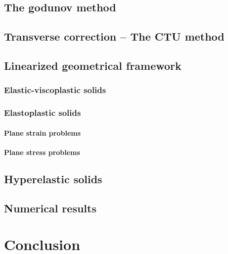 \documentclass[10pt,a4paper]{report}
\begin{document}
		\section{The godunov method}
		\section{Transverse correction -- The CTU method}
		\section{Linearized geometrical framework}
			\subsection{Elastic-viscoplastic solids}
			\subsection{Elastoplastic solids}
				\subsubsection{Plane strain problems}
				\subsubsection{Plane stress problems}
				
		\section{Hyperelastic solids}
		
		\section{Numerical results}
		
	\chapter{Conclusion}
	
	
\end{document}
